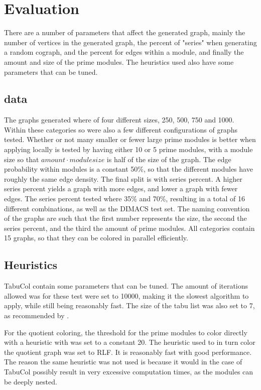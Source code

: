 \documentclass[a4paper]{article}
\begin{document}
\section{Evaluation}
\label{sec:Evaluation}
There are a number of parameters that affect the generated graph, mainly the
number of vertices in the generated graph, the percent of "series" when generating
a random cograph, and the percent for edges within a module, and finally the
amount and size of the prime modules. The heuristics used also have some
parameters that can be tuned.

\subsection{data}

The graphs generated where of four different sizes, 250, 500, 750 and 1000. 
Within these categories so were also a few different configurations of graphs
tested. Whether or not many smaller or fewer large prime modules is better when
applying locally is tested by having either 10 or 5 prime modules, with a module
size so that $amount \cdot module size$ is half of the size of the graph. The
edge probability within modules is a  constant 50\%, so that the different
modules have roughly the same edge density. The final split is with series
percent. A higher series percent yields a graph with more edges, and lower a
graph with fewer  edges. The series percent tested where 35\% and 70\%,
resulting in a total of 16 different combinations, as well as the DIMACS test
set. The naming convention of the graphs are such that the first number
represents the size, the second the series percent, and the third the amount of
prime modules. All categories contain 15 graphs, so that they can be colored in
parallel efficiently.


\subsection{Heuristics}
TabuCol contain some parameters that can be tuned. The amount of
iterations allowed was for these test were set to 10000, making it the slowest
algorithm to apply, while still being reasonably fast. The size of the tabu list 
was also set to 7, as recommended by \cite{1990}.

For the quotient coloring, the threshold for the prime modules to color
directly with a heuristic with was set to a constant 20. The heuristic used to
in turn color the quotient graph was set to RLF. It is reasonably fast with
good performance. The reason the same heuristic was not used is because it
would in the case of TabuCol possibly result in very excessive computation
times, as the modules can be deeply nested.
\end{document}
